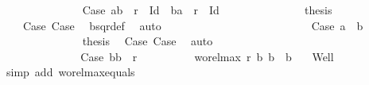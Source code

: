 \begin{isabellebody}
\ \ \ \ \ \ \ \ \ \ \ \ \ \isamarkupfalse%
\ Case{}{}{}{}{}{\isacharcolon}{\kern0pt}\ {\isachardoublequoteopen}{\isacharparenleft}{\kern0pt}a{}{\isacharcomma}{\kern0pt}b{}{\isacharparenright}{\kern0pt}\ {\isasymin}\ r\ {\isacharminus}{\kern0pt}\ Id\ {\isasymor}\ {\isacharparenleft}{\kern0pt}b{}{\isacharcomma}{\kern0pt}a{}{\isacharparenright}{\kern0pt}\ {\isasymin}\ r\ {\isacharminus}{\kern0pt}\ Id{\isachardoublequoteclose}\isanewline
\ \ \ \ \ \ \ \ \ \ \ \ \ \isamarkupfalse%
\ {\isacharquery}{\kern0pt}thesis\ \isamarkupfalse%
\ {}\ {}\ {}\ Case{}{}{}\ Case{}{}{}{}\ \isamarkupfalse%
\ bsqr{\isacharunderscore}{\kern0pt}def\ \isamarkupfalse%
\ auto\isanewline
\ \ \ \ \ \ \ \ \ \ \ \isamarkupfalse%
\isanewline
\ \ \ \ \ \ \ \ \ \ \ \ \ \isamarkupfalse%
\ Case{}{}{}{}{}{\isacharcolon}{\kern0pt}\ {\isachardoublequoteopen}a{}\ {\isacharequal}{\kern0pt}\ b{}{\isachardoublequoteclose}\isanewline
\ \ \ \ \ \ \ \ \ \ \ \ \ \isamarkupfalse%
\ {\isacharquery}{\kern0pt}thesis\ \isamarkupfalse%
\ Case{}{}{}{}\ Case{}{}{}\ \isamarkupfalse%
\ auto\isanewline
\ \ \ \ \ \ \ \ \ \ \ \isamarkupfalse%
\isanewline
\ \ \ \ \ \ \ \ \ \isamarkupfalse%
\isanewline
\ \ \ \ \ \ \ \isamarkupfalse%
\isanewline
\ \ \ \ \ \isamarkupfalse%
\isanewline
\ \ \ \ \ \ \ \isamarkupfalse%
\ Case{}{}{\isacharcolon}{\kern0pt}\ {\isachardoublequoteopen}{\isacharparenleft}{\kern0pt}b{}{\isacharcomma}{\kern0pt}b{}{\isacharparenright}{\kern0pt}\ {\isasymin}\ r{\isachardoublequoteclose}\isanewline
\ \ \ \ \ \ \ \isamarkupfalse%
\ {}{\isacharcolon}{\kern0pt}\ {\isachardoublequoteopen}wo{\isacharunderscore}{\kern0pt}rel{\isachardot}{\kern0pt}max{}\ r\ b{}\ b{}\ {\isacharequal}{\kern0pt}\ b{}{\isachardoublequoteclose}\ \ \isamarkupfalse%
\ Well\ {}\ \isamarkupfalse%
\ {\isacharparenleft}{\kern0pt}simp\ add{\isacharcolon}{\kern0pt}\ wo{\isacharunderscore}{\kern0pt}rel{\isachardot}{\kern0pt}max{}{\isacharunderscore}{\kern0pt}equals{}{\isacharparenright}{\kern0pt}\isanewline

\end{isabellebody}
